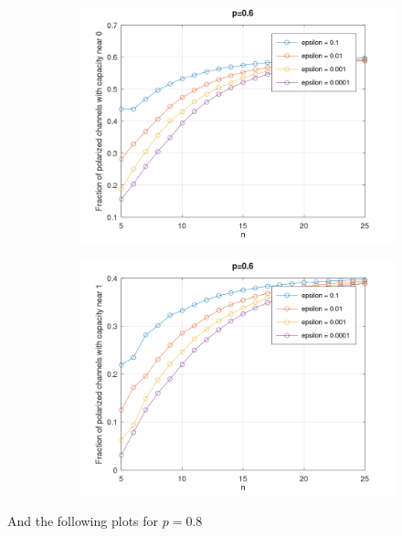 \documentclass[a4paper,10pt]{article}
\begin{document}
\begin{figure}[H]
    \centering
    \begin{subfigure}{.5\textwidth}
\includegraphics[width=.9\linewidth]{code/p=0.6 near 0.png}
    \end{subfigure}%
    \begin{subfigure}{.5\textwidth}
\includegraphics[width=.9\linewidth]{code/p=0.6 near 1.png}
    \end{subfigure}
\end{figure}
And the following plots for $p=0.8$\\
\end{document}
